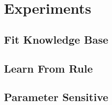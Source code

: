 
\section{Experiments}

\subsection{Fit Knowledge Base}

\subsection{Learn From Rule}

\subsection{Parameter Sensitive}
